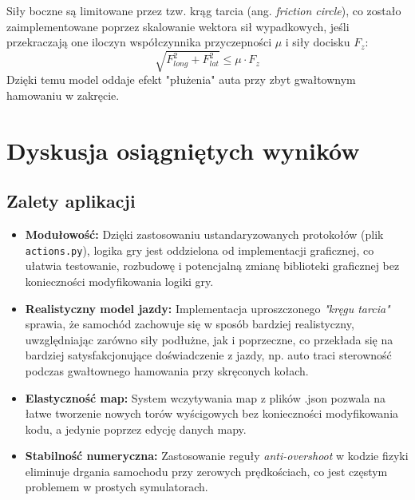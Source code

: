 \documentclass{article}
\begin{document}
Siły boczne są limitowane przez tzw. krąg tarcia (ang. \textit{friction circle}), co zostało zaimplementowane poprzez skalowanie wektora sił wypadkowych, jeśli przekraczają one iloczyn współczynnika przyczepności $\mu$ i siły docisku $F_z$:
\begin{equation}
    \sqrt{F_{long}^2 + F_{lat}^2} \leq \mu \cdot F_z
\end{equation}
Dzięki temu model oddaje efekt "płużenia" auta przy zbyt gwałtownym hamowaniu w zakręcie.

\section{Dyskusja osiągniętych wyników}
\subsection{Zalety aplikacji}
\begin{itemize}
    \item \textbf{Modułowość:} Dzięki zastosowaniu ustandaryzowanych protokołów (plik \texttt{actions.py}), logika gry jest oddzielona od implementacji graficznej, co ułatwia testowanie, rozbudowę i potencjalną zmianę biblioteki graficznej bez konieczności modyfikowania logiki gry.
    \item \textbf{Realistyczny model jazdy:} Implementacja uproszczonego \textit{"kręgu tarcia"} sprawia, że samochód zachowuje się w sposób bardziej realistyczny, uwzględniając zarówno siły podłużne, jak i poprzeczne, co przekłada się na bardziej satysfakcjonujące doświadczenie z jazdy, np. auto traci sterowność podczas gwałtownego hamowania przy skręconych kołach.
    \item \textbf{Elastyczność map:} System wczytywania map z plików .json pozwala na łatwe tworzenie nowych torów wyścigowych bez konieczności modyfikowania kodu, a jedynie poprzez edycję danych mapy.
    \item \textbf{Stabilność numeryczna:} Zastosowanie reguły \textit{anti-overshoot} w kodzie fizyki eliminuje drgania samochodu przy zerowych prędkościach, co jest częstym problemem w prostych symulatorach.
\end{itemize}
\end{document}
